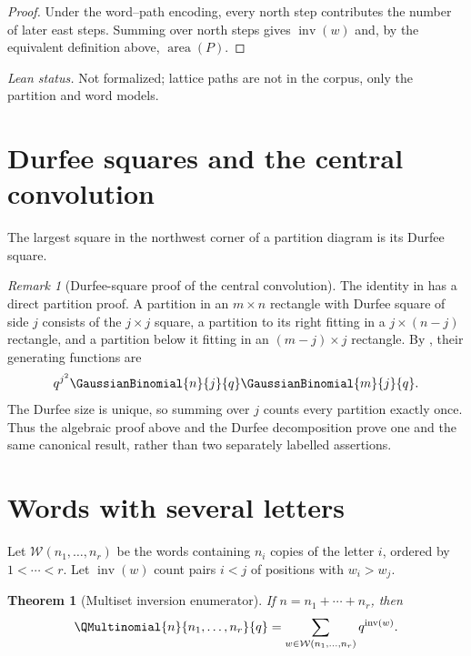 \documentclass[11pt,a4paper,oneside,openany]{book}
\newtheorem{theorem}{Theorem}[chapter]
\theoremstyle{definition}
\theoremstyle{remark}
\newtheorem{remark}[remark]{Remark}
\newcommand{\InversionNumber}[1]{\operatorname{inv}(#1)}
\newcommand{\LatticePathArea}[1]{\operatorname{area}(#1)}
\begin{document}
\begin{proof}
Under the word--path encoding, every north step contributes the number of
later east steps.  Summing over north steps gives $\InversionNumber{w}$ and,
by the equivalent definition above, $\LatticePathArea{P}$.
\end{proof}

\emph{Lean status.}  Not formalized; lattice paths are not in the corpus, only the
partition and word models.


\section{Durfee squares and the central convolution}

The largest square in the northwest corner of a partition diagram is its Durfee square.

\begin{remark}[Durfee-square proof of the central convolution]\label{rem:durfee-qvand}
The identity in  has a direct partition proof.
A partition in an $m\times n$ rectangle with Durfee square of side $j$
consists of the $j\times j$ square, a partition to its right fitting in a
$j\times(n-j)$ rectangle, and a partition below it fitting in an
$(m-j)\times j$ rectangle.  By , their
generating functions are
\[
 q^{j^2}\GaussianBinomial{n}{j}{q}\GaussianBinomial{m}{j}{q}.
\]
The Durfee size is unique, so summing over $j$ counts every partition exactly once.
Thus the algebraic proof above and the Durfee decomposition prove one and the
same canonical result, rather than two separately labelled assertions.
\end{remark}

\section{Words with several letters}

Let $\mathcal W(n_1,\dots,n_r)$ be the words containing $n_i$ copies of the letter $i$, ordered by $1<\cdots<r$.  Let $\InversionNumber{w}$ count pairs $i<j$ of positions with $w_i>w_j$.

\begin{theorem}[Multiset inversion enumerator]\label{thm:qmult-inversions}
If $n=n_1+\cdots+n_r$, then
\[
 \QMultinomial{n}{n_1,\dots,n_r}{q}
 =\sum_{w\in\mathcal W(n_1,\dots,n_r)}q^{\InversionNumber{w}}.
\]
\end{theorem}
\end{document}
